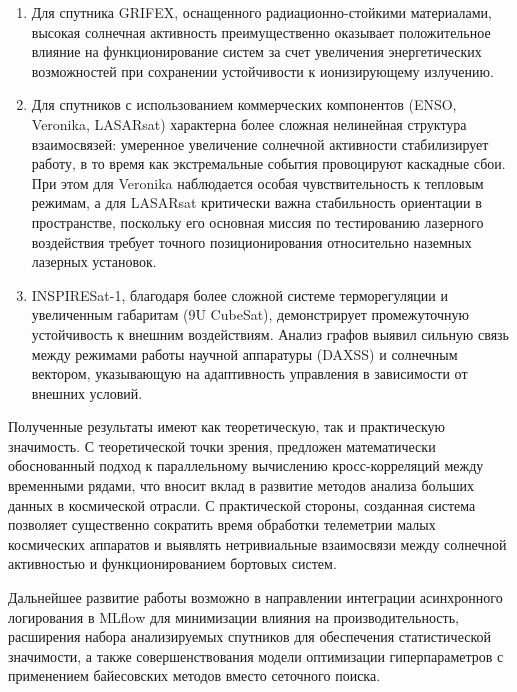 \begin{enumerate}
	\item Для спутника GRIFEX, оснащенного радиационно-стойкими материалами, высокая солнечная активность преимущественно оказывает положительное влияние на функционирование систем за счет увеличения энергетических возможностей при сохранении устойчивости к ионизирующему излучению.

	\item Для спутников с использованием коммерческих компонентов (ENSO, Veronika, LASARsat) характерна более сложная нелинейная структура взаимосвязей: умеренное увеличение солнечной активности стабилизирует работу, в то время как экстремальные события провоцируют каскадные сбои. При этом для Veronika наблюдается особая чувствительность к тепловым режимам, а для LASARsat критически важна стабильность ориентации в пространстве, поскольку его основная миссия по тестированию лазерного воздействия требует точного позиционирования относительно наземных лазерных установок.

	\item INSPIRESat-1, благодаря более сложной системе терморегуляции и увеличенным габаритам (9U CubeSat), демонстрирует промежуточную устойчивость к внешним воздействиям. Анализ графов выявил сильную связь между режимами работы научной аппаратуры (DAXSS) и солнечным вектором, указывающую на адаптивность управления в зависимости от внешних условий.
\end{enumerate}

Полученные результаты имеют как теоретическую, так и практическую значимость. С
теоретической точки зрения, предложен математически обоснованный подход к
параллельному вычислению кросс-корреляций между временными рядами, что вносит
вклад в развитие методов анализа больших данных в космической отрасли. С
практической стороны, созданная система позволяет существенно сократить время
обработки телеметрии малых космических аппаратов и выявлять нетривиальные
взаимосвязи между солнечной активностью и функционированием бортовых систем.

Дальнейшее развитие работы возможно в направлении интеграции асинхронного
логирования в MLflow для минимизации влияния на производительность, расширения
набора анализируемых спутников для обеспечения статистической значимости, а
также совершенствования модели оптимизации гиперпараметров с применением
байесовских методов вместо сеточного поиска.

